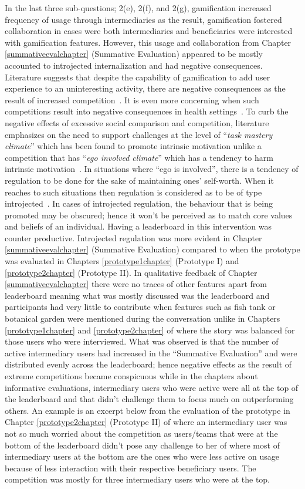 In the last three sub-questions; 2(e), 2(f), and 2(g), gamification increased frequency of usage through intermediaries as the result, gamification fostered collaboration in cases were both intermediaries and beneficiaries were interested with gamification features. However, this usage and collaboration from Chapter \ref{summativeevalchapter} (Summative Evaluation) appeared to be mostly accounted to introjected internalization and had negative consequences. Literature suggests that despite the capability of gamification to add user experience to an uninteresting activity, there are negative consequences as the result of increased competition~\citep{jia2016personality}. It is even more concerning when such competitions result into negative consequences in health settings~\citep{grimes2009toward}. To curb the negative effects of excessive social comparison and competition, literature emphasizes on the need to support challenges at the level of ``\emph{task mastery climate}'' which has been found to promote intrinsic motivation unlike a competition that has ``\emph{ego involved climate}'' which has a tendency to harm intrinsic motivation~\citep{saksono2015spaceship}. In situations where ``ego is involved'', there is a tendency of regulation to be done for the sake of maintaining ones' self-worth. When it reaches to such situations then regulation is considered as to be of type introjected~\citep{ryan2000:self}. In cases of introjected regulation, the behaviour that is being promoted may be obscured; hence it won't be perceived as to match core values and beliefs of an individual. Having a leaderboard in this intervention was counter productive. Introjected regulation was more evident in Chapter \ref{summativeevalchapter} (Summative Evaluation) compared to when the prototype was evaluated in Chapters \ref{prototype1chapter} (Prototype I) and \ref{prototype2chapter} (Prototype II). In qualitative feedback of Chapter \ref{summativeevalchapter} there were no traces of other features apart from leaderboard meaning what was mostly discussed was the leaderboard and participants had very little to contribute when features such as fish tank or botanical garden were mentioned during the conversation unlike in Chapters \ref{prototype1chapter} and \ref{prototype2chapter} of where the story was balanced for those users who were interviewed. What was observed is that the number of active intermediary users had increased in the ``Summative Evaluation'' and were distributed evenly across the leaderboard; hence negative effects as the result of extreme competitions became conspicuous while in the chapters about informative evaluations, intermediary users who were active were all at the top of the leaderboard and that didn't challenge them to focus much on outperforming others.  An example is an excerpt below from the evaluation of the prototype in Chapter \ref{prototype2chapter} (Prototype II) of where an intermediary user was not so much worried about the competition as users/teams that were at the bottom of the leaderboard didn't pose any challenge to her of where most of intermediary users at the bottom are the ones who were less active on usage because of less interaction with their respective beneficiary users. The competition was mostly for three intermediary users who were at the top.  

